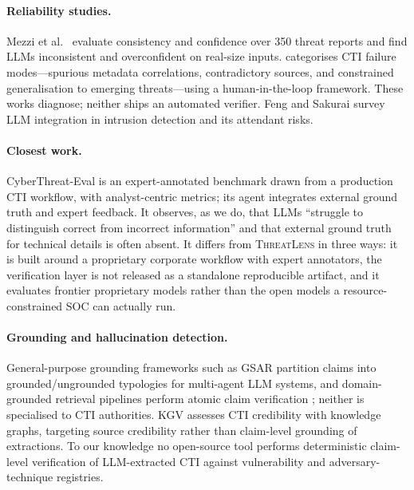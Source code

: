 \documentclass[10pt,twocolumn]{article}
\newcommand{\tool}{\textsc{ThreatLens}\xspace}
\begin{document}
\paragraph{Reliability studies.}
Mezzi et al.\ \cite{mezzi2025unreliable} evaluate consistency and confidence
over 350 threat reports and find LLMs inconsistent and overconfident on
real-size inputs. \cite{uncovering2025vulnerabilities} categorises CTI failure
modes---spurious metadata correlations, contradictory sources, and constrained
generalisation to emerging threats---using a human-in-the-loop framework. These
works diagnose; neither ships an automated verifier. Feng and Sakurai
\cite{feng2025nids} survey LLM integration in intrusion detection and its
attendant risks.

\paragraph{Closest work.}
CyberThreat-Eval \cite{cyberthreateval2026} is an expert-annotated benchmark
drawn from a production CTI workflow, with analyst-centric metrics; its agent
integrates external ground truth and expert feedback. It observes, as we do,
that LLMs ``struggle to distinguish correct from incorrect information'' and
that external ground truth for technical details is often absent. It differs
from \tool in three ways: it is built around a proprietary corporate workflow
with expert annotators, the verification layer is not released as a standalone
reproducible artifact, and it evaluates frontier proprietary models rather than
the open models a resource-constrained SOC can actually run.

\paragraph{Grounding and hallucination detection.}
General-purpose grounding frameworks such as GSAR \cite{gsar2026} partition
claims into grounded/ungrounded typologies for multi-agent LLM systems, and
domain-grounded retrieval pipelines perform atomic claim verification
\cite{tieredretrieval2026}; neither is specialised to CTI authorities. KGV
\cite{kgv2024} assesses CTI credibility with knowledge graphs, targeting source
credibility rather than claim-level grounding of extractions. To our knowledge
no open-source tool performs deterministic claim-level verification of
LLM-extracted CTI against vulnerability and adversary-technique registries.

\end{document}
